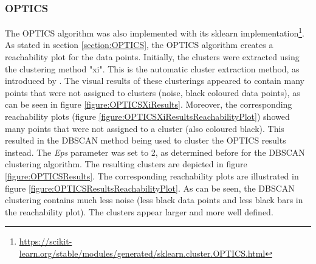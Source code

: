 \subsubsection{OPTICS}
The OPTICS algorithm was also implemented with its sklearn implementation\footnote{\url{https://scikit-learn.org/stable/modules/generated/sklearn.cluster.OPTICS.html}}. As stated in section \ref{section:OPTICS}, the OPTICS algorithm creates a reachability plot for the data points. Initially, the clusters were extracted using the clustering method "xi". This is the automatic cluster extraction method, as introduced by \textcite{OPTICS}. The visual results of these clusterings appeared to contain many points that were not assigned to clusters (noise, black coloured data points), as can be seen in figure \ref{figure:OPTICSXiResults}. Moreover, the corresponding reachability plots (figure \ref{figure:OPTICSXiResultsReachabilityPlot}) showed many points that were not assigned to a cluster (also coloured black). This resulted in the DBSCAN method being used to cluster the OPTICS results instead. The \textit{Eps} parameter was set to 2, as determined before for the DBSCAN clustering algorithm. The resulting clusters are depicted in figure \ref{figure:OPTICSResults}. The corresponding reachability plots are illustrated in figure \ref{figure:OPTICSResultsReachabilityPlot}. As can be seen, the DBSCAN clustering contains much less noise (less black data points and less black bars in the reachability plot). The clusters appear larger and more well defined.


